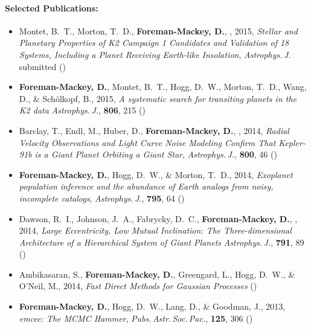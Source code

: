 \documentclass[12pt]{article}
\begin{document}
\paragraph{Selected Publications:}
\begin{itemize}\setlength{\itemsep}{0pt}

\item Montet, B.~T., Morton, T.~D., {\bf Foreman-Mackey, D.}, \etal, 2015,
    \emph{Stellar and Planetary Properties of K2 Campaign 1 Candidates and
          Validation of 18 Systems, Including a Planet Receiving Earth-like
          Insolation}, \textit{Astrophys.\,J.} submitted ()

\item {\bf Foreman-Mackey, D.}, Montet, B.~T., Hogg, D.~W., Morton, T.~D.,
    Wang, D., \& Sch\"olkopf, B., 2015,
    \emph{A systematic search for transiting planets in the K2 data}
    \textit{Astrophys.\,J.}, \textbf{806}, 215 ()

\item Barclay, T., Endl, M.,  Huber, D., {\bf Foreman-Mackey, D.}, \etal, 2014,
    \emph{Radial Velocity Observations and Light Curve Noise Modeling Confirm
          That Kepler-91b is a Giant Planet Orbiting a Giant Star},
    \textit{Astrophys.\,J.}, \textbf{800}, 46 ()

\item {\bf Foreman-Mackey, D.}, Hogg, D.~W., \& Morton, T.~D., 2014,
    \emph{Exoplanet population inference and the abundance of Earth analogs
          from noisy, incomplete catalogs},
    \textit{Astrophys.\,J.}, \textbf{795}, 64 ()

\item Dawson, R.~I., Johnson,  J.~A., Fabrycky, D.~C.,
    {\bf Foreman-Mackey, D.}, \etal, 2014,
    \emph{Large Eccentricity, Low Mutual Inclination: The Three-dimensional
          Architecture of a Hierarchical System of Giant Planets}
    \textit{Astrophys.\,J.}, \textbf{791}, 89 ()

\item Ambikasaran, S., {\bf Foreman-Mackey, D.}, Greengard, L., Hogg, D.~W.,
    \& O'Neil, M., 2014,
    \emph{Fast Direct Methods for Gaussian Processes} ()

\item {\bf Foreman-Mackey, D.}, Hogg, D.~W., Lang, D., \& Goodman, J., 2013,
    \emph{emcee: The MCMC Hammer},
    \textit{Pubs.\,Astr.\,Soc.\,Pac.}, \textbf{125}, 306 ()

\end{itemize}
\end{document}
